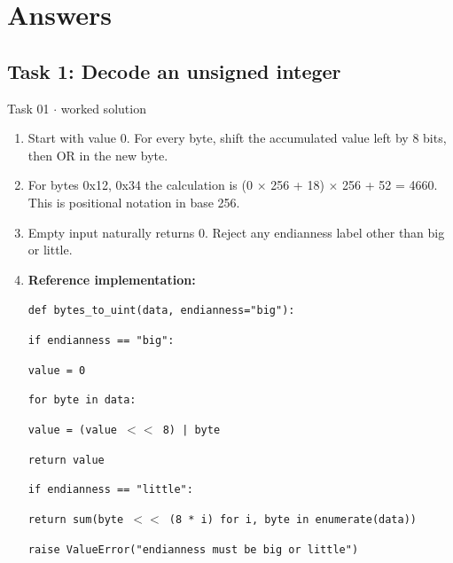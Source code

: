 \documentclass[11pt]{article}
\begin{document}
\section{Answers}
\begin{keepsection}\subsection{Task 1: Decode an unsigned integer}

\begin{workedbox}{Task 01 \ensuremath{\cdot} worked solution}
\begin{enumerate}
\item Start with value 0. For every byte, shift the accumulated value left by 8 bits, then OR in the new byte.
\item For bytes 0x12, 0x34 the calculation is (0 \ensuremath{\times} 256 + 18) \ensuremath{\times} 256 + 52 = 4660. This is positional notation in base 256.
\item Empty input naturally returns 0. Reject any endianness label other than big or little.
\item {}
\textbf{Reference implementation:}
\begin{tcolorbox}[colback=Paperblue,colframe=Paperblue,boxrule=0pt,arc=0pt,left=7pt,right=7pt,top=5pt,bottom=5pt]\small\sloppy
\noindent\hspace*{0em}\texttt{def bytes\_to\_uint(data, endianness="big"):}\par
\noindent\hspace*{1em}\texttt{if endianness == "big":}\par
\noindent\hspace*{3em}\texttt{value = 0}\par
\noindent\hspace*{3em}\texttt{for byte in data:}\par
\noindent\hspace*{5em}\texttt{value = (value \ensuremath{<}\ensuremath{<} 8) | byte}\par
\noindent\hspace*{3em}\texttt{return value}\par
\noindent\hspace*{1em}\texttt{if endianness == "little":}\par
\noindent\hspace*{3em}\texttt{return sum(byte \ensuremath{<}\ensuremath{<} (8 * i) for i, byte in enumerate(data))}\par
\noindent\hspace*{1em}\texttt{raise ValueError("endianness must be big or little")}\par
\end{tcolorbox}
\end{enumerate}
\end{workedbox}

\end{keepsection}
\end{document}
